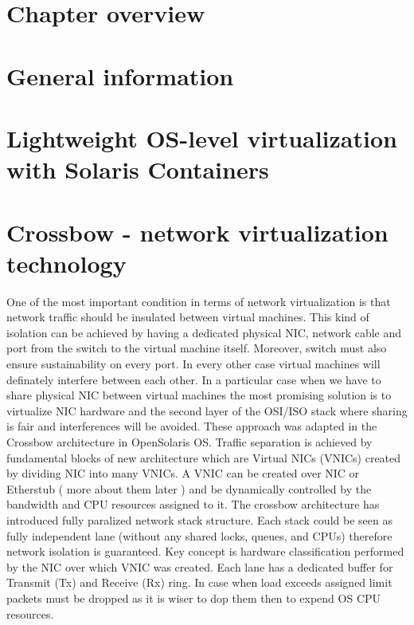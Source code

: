 \documentclass[11pt]{book}
\begin{document}
    \section*{Chapter overview}

    \section{General information}

    \section{Lightweight OS-level virtualization with Solaris Containers}

    \section{Crossbow - network virtualization technology}

        One of the most important condition in terms of network virtualization is that network traffic should be insulated between virtual machines.
        This kind of isolation can be achieved by having a dedicated physical NIC, network cable and port from the switch to the virtual machine itself. 
        Moreover, switch must also ensure sustainability on every port. In every other case virtual machines will definately interfere between each other.
        In a particular case when we have to share physical NIC between virtual machines the most promising solution is to virtualize NIC hardware and the
         second layer of the OSI/ISO stack where sharing is fair and interferences will be avoided. These approach was adapted in the Crossbow architecture
         in OpenSolaris OS.
        Traffic separation is achieved by fundamental blocks of new architecture which are Virtual NICs (VNICs) created by dividing NIC into many VNICs. 
        A VNIC can be created over NIC or Etherstub ( more about them later ) and be dynamically controlled by the bandwidth and CPU resources assigned to
        it.
        The crossbow architecture has introduced fully paralized network stack structure. Each stack could be seen as fully independent lane (without
        any shared locks, queues, and CPUs) therefore network isolation is guaranteed. Key concept is hardware classification performed by the NIC over 
        which VNIC was created. Each lane has a dedicated buffer for Transmit (Tx) and Receive (Rx) ring. In case when load exceeds assigned limit packets
         must be dropped as it is wiser to dop them then to expend OS CPU resources. 
\end{document}
